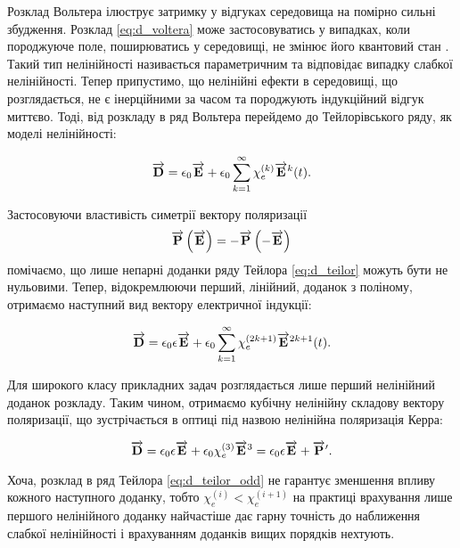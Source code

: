 Розклад Вольтера ілюструє затримку у відгуках середовища на помірно сильні 
збудження. Розклад \eqref{eq:d_voltera} може застосовуватись у випадках,
коли породжуюче поле, поширюватись у середовищі, не змінює його квантовий
стан \cite{imp:Smirnov2012}. Такий тип нелінійності називається 
параметричним та відповідає випадку слабкої нелінійності. Тепер припустимо, 
що нелінійні ефекти в середовищі, що розглядається, не є інерційними за часом 
та породжують індукційний відгук миттєво. Тоді, від розкладу в ряд Вольтера 
перейдемо до Тейлорівського ряду, як моделі нелінійності:

\begin{equation} \label{eq:d_teilor}
\overrightarrow{\mathbf D} = \epsilon_0 \overrightarrow{\mathbf E} + 
\epsilon_0 \sum_{k=1}^{\infty} \chi_e^{(k)} \overrightarrow{\mathbf E}^k (t).
\end{equation}

Застосовуючи властивість симетрії вектору поляризації 
%
\begin{equation}
\overrightarrow{\mathbf P} \left( \overrightarrow{\mathbf E} \right) = - \overrightarrow{\mathbf P} \left( - \overrightarrow{\mathbf E} \right)
\end{equation}
%
помічаємо, що лише непарні доданки ряду Тейлора \eqref{eq:d_teilor} можуть 
бути не нульовими. Тепер, відокремлюючи перший, лінійний, доданок з 
поліному, отримаємо наступний вид вектору електричної індукції:

\begin{equation} \label{eq:d_teilor_odd}
\overrightarrow{\mathbf D} = \epsilon_0 \epsilon \overrightarrow{\mathbf E} + 
\epsilon_0 \sum_{k=1}^{\infty} \chi_e^{(2k+1)} \overrightarrow{\mathbf E}^{2k+1} (t).
\end{equation}

Для широкого класу прикладних задач розглядається
лише перший нелінійний доданок розкладу. Таким чином, отримаємо кубічну 
нелінійну складову вектору поляризації, що зустрічається в оптиці під 
назвою нелінійна поляризація Керра:

\begin{equation} \label{eq:d_kerr}
\overrightarrow{\mathbf D} = 
\epsilon_0 \epsilon \overrightarrow{\mathbf E} + \epsilon_0 \chi_e^{(3)} \overrightarrow{\mathbf E}^{3} = 
\epsilon_0 \epsilon \overrightarrow{\mathbf E} + \overrightarrow{\mathbf P}^\prime.
\end{equation}

Хоча, розклад в ряд Тейлора \eqref{eq:d_teilor_odd} не гарантує зменшення 
впливу кожного наступного доданку, тобто $ \chi_e^{(i)} < \chi_e^{(i+1)} $
на практиці врахування лише першого нелінійного доданку найчастіше дає
гарну точність до наближення слабкої нелінійності і врахуванням доданків
вищих порядків нехтують.

